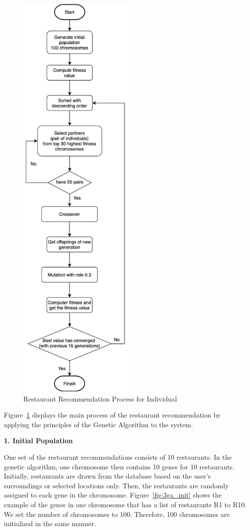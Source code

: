 \documentclass[12pt,oneside,openright,a4paper]{cpe-english-project}
\begin{document}
\begin{figure}[H]\centering
\includegraphics[height=600pt]{./images/3GeneticAlgorithmFlowchart.png}
\caption{Restaurant Recommendation Process for Individual}\label{fig:3GeneticAlgorithmFlowchart}
\end{figure}

Figure~\ref{fig:3GeneticAlgorithmFlowchart} displays the main process of the restaurant recommendation by applying the principles of the Genetic Algorithm to the system.

\textbf{1. Initial Population}\par

One set of the restaurant recommendations consists of 10 restaurants. In the genetic algorithm, one chromosome then contains 10 genes for 10 restaurants.  Initially, restaurants are drawn from the database based on the user's surroundings or selected locations only. Then, the restaurants are randomly assigned to each gene in the chromosome. Figure~\ref{fig:3ga_init} shows the example of the genes in one chromosome that has a list of restaurants R1 to R10. We set the number of chromosomes to 100. Therefore, 100 chromosomes are initialized in the same manner.
\end{document}
